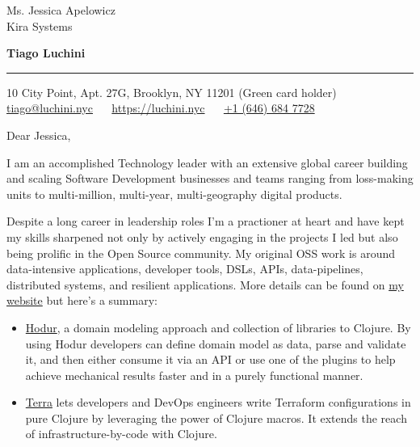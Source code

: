 \documentclass{letter} %
\begin{document}
\signature{Tiago Luchini}                  %
\longindentation=0pt                       %
\let\raggedleft\raggedright                %
 
 
\begin{letter}{Ms. Jessica Apelowicz \\
Kira Systems}


\begin{flushleft}
{\large\bf Tiago Luchini}
\end{flushleft}
\medskip\hrule
\begin{flushright}
\hfill 10 City Point, Apt. 27G, Brooklyn, NY 11201 (Green card holder)\\ \hfill
\href{mailto:tiago@luchini.nyc}{tiago@luchini.nyc} ~~
\href{https://luchini.nyc}{https://luchini.nyc} ~~ \href{tel:+16466847728}{+1
  (646) 684 7728}
\end{flushright}
\vfill %
 
\opening{Dear Jessica,}

\noindent I am an accomplished Technology leader with an extensive
global career building and scaling Software Development businesses and
teams ranging from loss-making units to multi-million, multi-year,
multi-geography digital products.

\noindent Despite a long career in leadership roles I'm a practioner
at heart and have kept my skills sharpened not only by actively
engaging in the projects I led but also being prolific in the Open
Source community. My original OSS work is around data-intensive
applications, developer tools, DSLs, APIs, data-pipelines, distributed
systems, and resilient applications. More details can be found on
\href{https://luchini.nyc}{my website} but here's a summary:

\begin{itemize}
\item \href{https://github.com/luchiniatwork/hodur-engine}{Hodur}, a
  domain modeling approach and collection of libraries to Clojure. By
  using Hodur developers can define domain model as data, parse and
  validate it, and then either consume it via an API or use one of the
  plugins to help achieve mechanical results faster and in a purely
  functional manner.

\item \href{https://github.com/luchiniatwork/terra}{Terra} lets
  developers and DevOps engineers write Terraform configurations in
  pure Clojure by leveraging the power of Clojure macros. It extends
  the reach of infrastructure-by-code with Clojure.


\end{itemize}
\end{letter}
\end{document}
